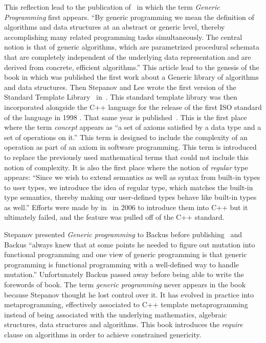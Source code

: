 This reflection lead to the publication of~\parencite{musser.1988.generic} in which the term \emph{Generic Programming}
first appears. ``By generic programming we mean the definition of algorithms and data structures at an abstract or
generic level, thereby accomplishing many related programming tasks simultaneously. The central notion is that of
generic algorithms, which are parametrized procedural schemata that are completely independent of the underlying data
representation and are derived from concrete, efficient algorithms.'' This article lead to the genesis of the book
\citeauthor{musser.1989.ada} in which was published the first work about a Generic library of algorithms and data
structures. Then Stepanov and Lee wrote the first version of the Standard Template
Library~\parencite{stepanov.1995.standard} in~. This standard template library
was then incorporated alongside the C++ language for the release of the first ISO standard of the language in 1998
\parencite{iso.1998.cpp}. That same year is published~\parencite{dehnert.1998.fundamentals}. This is the first place
where the term \emph{concept} appears as ``a set of axioms satisfied by a data type and a set of operations on it.''
This term is designed to include the complexity of an operation as part of an axiom in software programming. This term
is introduced to replace the previously used mathematical terms that could not include this notion of complexity. It is
also the first place where the notion of \emph{regular} type appears: ``Since we wish to extend semantics as well as
syntax from built-in types to user types, we introduce the idea of regular type, which matches the built-in type
semantics, thereby making our user-defined types behave like built-in types as well.'' Efforts were made by
\citeauthor{gregor.2006.concepts-art} in~\parencite{gregor.2006.concepts-art} in 2006 to introduce them into C++ but it
ultimately failed, and the feature was pulled off of the C++ standard.

Stepanov presented \emph{Generic programming} to Backus before publishing~\parencite{stepanov.2009.elements} and Backus
``always knew that at some points he needed to figure out mutation into functional programming and one view of generic
programming is that generic programming is functional programming with a well-defined way to handle mutation.''
Unfortunately Backus passed away before being able to write the forewords of  book.
The term \emph{generic programming} never appears in the book because Stepanov thought he lost control over it. It has
evolved in practice into metaprogramming, effectively associated to C++ template metaprogramming instead of being
associated with the underlying mathematics, algebraic structures, data structures and algorithms. This book introduces
the \emph{require} clause on algorithms in order to achieve constrained genericity.

